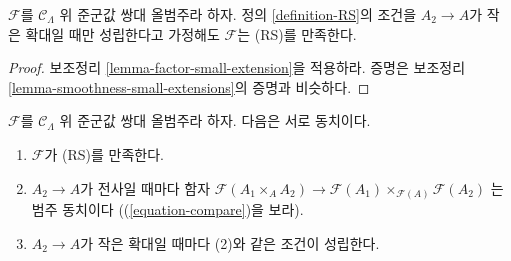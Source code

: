 \begin{lemma}
\label{lemma-RS-small-extension}
$\mathcal{F}$를 $\mathcal C_\Lambda$ 위 준군값 쌍대 올범주라 하자.
정의 \ref{definition-RS}의 조건을 $A_2 \to A$가 작은 확대일 때만
성립한다고 가정해도 $\mathcal{F}$는 (RS)를 만족한다.
\end{lemma}

\begin{proof}
보조정리 \ref{lemma-factor-small-extension}을 적용하라.
증명은 보조정리 \ref{lemma-smoothness-small-extensions}의 증명과 비슷하다.
\end{proof}

\begin{lemma}
\label{lemma-RS-2-categorical}
$\mathcal{F}$를 $\mathcal{C}_\Lambda$ 위 준군값 쌍대 올범주라 하자.
다음은 서로 동치이다.
\begin{enumerate}
\item $\mathcal{F}$가 (RS)를 만족한다.
\item $A_2 \to A$가 전사일 때마다 함자
$\mathcal{F}(A_1 \times_A A_2) \to
\mathcal{F}(A_1) \times_{\mathcal{F}(A)} \mathcal{F}(A_2)$
는 범주 동치이다
((\ref{equation-compare})을 보라). %
\item $A_2 \to A$가 작은 확대일 때마다 (2)와 같은 조건이 성립한다.
\end{enumerate}
\end{lemma}

